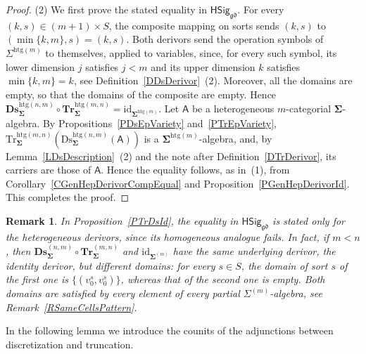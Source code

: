 \documentclass[a4paper, reqno]{amsbook}
\newcommand{\sig}[1]{\mathbf{#1}}             %
\newcommand{\calg}[1]{\boldsymbol{\mathsf{#1}}} %
\newcommand{\gd}{\mathfrak{gd}}              %
\newcommand{\htg}{\mathrm{htg}}                %
\newcommand{\id}{\mathrm{id}}
\newcommand{\Ds}{\mathrm{Ds}}
\newcommand{\Tr}{\mathrm{Tr}}
\newcommand{\bDs}{\mathbf{Ds}}
\newcommand{\bTr}{\mathbf{Tr}}
\theoremstyle{plain}
\newtheorem{remark}[theorem]{Remark}
\theoremstyle{definition}
\begin{document}
\begin{proof}
(2) We first prove the stated equality in $\mathsf{HSig}_{\gd}$.
For every $(k,s)\in(m+1)\times S$, the composite mapping on sorts sends $(k,s)$ to $(\min\{k,m\},s)=(k,s)$.
Both derivors send the operation symbols of $\Sigma^{\htg(m)}$ to themselves, applied to variables, since, for every such symbol, its lower dimension $j$ satisfies $j<m$ and its upper dimension $k$ satisfies $\min\{k,m\}=k$, see Definition~\ref{DDsDerivor}~(2).
Moreover, all the domains are empty, so that the domains of the composite are empty.
Hence $\bDs^{\htg(n,m)}_{\sig{\Sigma}}\circ\bTr^{\htg(m,n)}_{\sig{\Sigma}}=\id_{\sig{\Sigma}^{\htg(m)}}$.
Let $\calg{A}$ be a heterogeneous $m$-categorial $\sig{\Sigma}$-algebra.
By Propositions~\ref{PDsEpVariety} and~\ref{PTrEpVariety}, $\Tr^{\htg(m,n)}_{\sig{\Sigma}}(\Ds^{\htg(n,m)}_{\sig{\Sigma}}(\calg{A}))$ is a $\sig{\Sigma}^{\htg(m)}$-algebra, and, by Lemma~\ref{LDsDescription}~(2) and the note after Definition~\ref{DTrDerivor}, its carriers are those of $\calg{A}$.
Hence the equality follows, as in~(1), from Corollary~\ref{CGenHepDerivorCompEqual} and Proposition~\ref{PGenHepDerivorId}. This completes the proof.
\end{proof}

\begin{remark}\label{RTrDsIdHomogeneous}
In Proposition~\ref{PTrDsId}, the equality in $\mathsf{HSig}_{\gd}$ is stated only for the heterogeneous derivors, since its homogeneous analogue fails.
In fact, if $m<n$, then $\bDs^{(n,m)}_{\sig{\Sigma}}\circ\bTr^{(m,n)}_{\sig{\Sigma}}$ and $\id_{\sig{\Sigma}^{(m)}}$ have the same underlying derivor, the identity derivor, but different domains: for every $s\in S$, the domain of sort $s$ of the first one is $\{(v^s_0,v^s_0)\}$, whereas that of the second one is empty.
Both domains are satisfied by every element of every partial $\Sigma^{(m)}$-algebra, see Remark~\ref{RSameCellsPattern}.
\end{remark}

In the following lemma we introduce the counits of the adjunctions between discretization and truncation.
\end{document}
